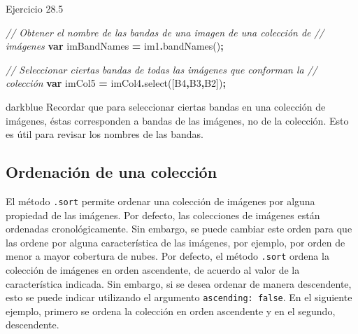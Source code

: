 \documentclass[
  12pt,
  letterpaper,
  twoside]{book}
\newenvironment{Shaded}{\begin{snugshade}}{\end{snugshade}}
\newcommand{\CommentTok}[1]{\textcolor[rgb]{0.56,0.35,0.01}{\textit{#1}}}
\newcommand{\FunctionTok}[1]{\textcolor[rgb]{0.00,0.00,0.00}{#1}}
\newcommand{\KeywordTok}[1]{\textcolor[rgb]{0.13,0.29,0.53}{\textbf{#1}}}
\newcommand{\NormalTok}[1]{#1}
\newcommand{\OperatorTok}[1]{\textcolor[rgb]{0.81,0.36,0.00}{\textbf{#1}}}
\newcommand{\StringTok}[1]{\textcolor[rgb]{0.31,0.60,0.02}{#1}}
\begin{document}
Ejercicio 28.5

\begin{Shaded}
\begin{Highlighting}[]
\CommentTok{// Obtener el nombre de las bandas de una imagen de una colección de }
\CommentTok{// imágenes}
\KeywordTok{var}\NormalTok{ imBandNames }\OperatorTok{=}\NormalTok{ im1}\OperatorTok{.}\FunctionTok{bandNames}\NormalTok{()}\OperatorTok{;}

\CommentTok{// Seleccionar ciertas bandas de todas las imágenes que conforman la }
\CommentTok{// colección}
\KeywordTok{var}\NormalTok{ imCol5 }\OperatorTok{=}\NormalTok{ imCol4}\OperatorTok{.}\FunctionTok{select}\NormalTok{([}\StringTok{\textquotesingle{}B4\textquotesingle{}}\OperatorTok{,}\StringTok{\textquotesingle{}B3\textquotesingle{}}\OperatorTok{,}\StringTok{\textquotesingle{}B2\textquotesingle{}}\NormalTok{])}\OperatorTok{;}
\end{Highlighting}
\end{Shaded}

\begin{bluebox2}

\begin{awesomeblock}{5pt}{\faLightbulb}{darkblue}
Recordar que para seleccionar ciertas bandas en una colección de imágenes, éstas corresponden a bandas de las imágenes, no de la colección. Esto es útil para revisar los nombres de las bandas.

\end{awesomeblock}

\end{bluebox2}

\hypertarget{ordenaciuxf3n-de-una-colecciuxf3n}{%
\subsection{Ordenación de una colección}\label{ordenaciuxf3n-de-una-colecciuxf3n}}

El método \texttt{.sort} permite ordenar una colección de imágenes por alguna propiedad de las imágenes. Por defecto, las colecciones de imágenes están ordenadas cronológicamente. Sin embargo, se puede cambiar este orden para que las ordene por alguna característica de las imágenes, por ejemplo, por orden de menor a mayor cobertura de nubes. Por defecto, el método \texttt{.sort} ordena la colección de imágenes en orden ascendente, de acuerdo al valor de la característica indicada. Sin embargo, si se desea ordenar de manera descendente, esto se puede indicar utilizando el argumento \texttt{ascending:\ false}. En el siguiente ejemplo, primero se ordena la colección en orden ascendente y en el segundo, descendente.
\end{document}
